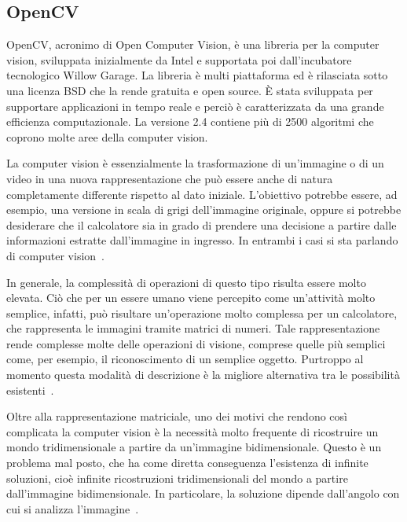 			\subsection*{OpenCV}
				\mbox{OpenCV}, acronimo di Open Computer Vision, è una libreria per la computer vision, sviluppata inizialmente da Intel e supportata poi dall'incubatore tecnologico Willow Garage.
				La libreria è multi piattaforma ed è rilasciata sotto una licenza BSD che la rende gratuita e open source. 
				È stata sviluppata per supportare applicazioni in tempo reale e perciò è caratterizzata da una grande efficienza computazionale.
				La versione 2.4 contiene più di 2500 algoritmi che coprono molte aree della computer vision.

				La computer vision è essenzialmente la trasformazione di un'immagine o di un video in una nuova rappresentazione che può essere anche di natura completamente differente rispetto al dato iniziale. 
				L'obiettivo potrebbe essere, ad esempio, una versione in scala di grigi dell'immagine originale, oppure si potrebbe desiderare che il calcolatore sia in grado di prendere una decisione a partire dalle informazioni estratte dall'immagine in ingresso.
				In entrambi i casi si sta parlando di computer vision~\cite{bradski2008learning}.
		
				In generale, la complessità di operazioni di questo tipo risulta essere molto elevata. 
				Ciò che per un essere umano viene percepito come un'attività molto semplice, infatti, può risultare un'operazione molto complessa per un calcolatore, che rappresenta le immagini tramite matrici di numeri. 
				Tale rappresentazione rende complesse molte delle operazioni di visione, comprese quelle più semplici come, per esempio, il riconoscimento di un semplice oggetto.
				Purtroppo al momento questa modalità di descrizione è la migliore alternativa tra le possibilità esistenti~\cite{bradski2008learning}.

				Oltre alla rappresentazione matriciale, uno dei motivi che rendono così complicata la computer vision è la necessità molto frequente di ricostruire un mondo tridimensionale a partire da un'immagine bidimensionale. 
				Questo è un problema mal posto, che ha come diretta conseguenza l'esistenza di infinite soluzioni, cioè infinite ricostruzioni tridimensionali del mondo a partire dall'immagine bidimensionale.
				In particolare, la soluzione dipende dall'angolo con cui si analizza l'immagine~\cite{bradski2008learning}.


